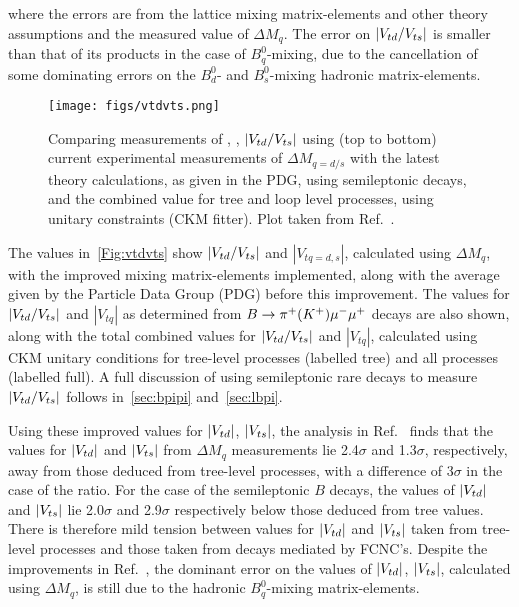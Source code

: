 where the errors are from the lattice mixing matrix-elements and other theory assumptions and the measured value of $\Delta M_{q}$. The error on $|{V_{{t}{d}}}/{V_{{t}{s}}}|$ is smaller than that of its products in the case of $B^{0}_{q}$-mixing, due to the cancellation of some dominating errors on the $B^{0}_{d}$- and $B^{0}_{s}$-mixing hadronic matrix-elements. %
\begin{figure}
\texttt{[image: figs/vtdvts.png]}
\caption{Comparing measurements of \Vtd, \Vts, $|{V_{{t}{d}}}/{V_{{t}{s}}}|$ using (top to bottom) current experimental measurements of $\Delta M_{q = d/s}$ with the latest theory calculations, as given in the PDG\cite{pdg},  using semileptonic decays, and the combined value for tree and loop level processes, using unitary constraints (CKM fitter\cite{ckm}). Plot taken from Ref.~\cite{vtdvts}.}
\label{Fig:vtdvts}
\end{figure}

The values in~\autoref{Fig:vtdvts} show $|{V_{{t}{d}}}/{V_{{t}{s}}}|$ and $|V_{tq = d,s}|$, calculated using $\Delta M_{q}$, with the improved mixing matrix-elements implemented, along with the average given by the Particle Data Group (PDG)\cite{pdg} before this improvement. The values for $|{V_{{t}{d}}}/{V_{{t}{s}}}|$ and $|V_{tq}|$ as determined from ${B}\rightarrow{\ensuremath{{\pi}^+}}({K}^{+}){\mu^-}{\mu^+}$ decays are also shown, along with the total combined values for $|{V_{{t}{d}}}/{V_{{t}{s}}}|$ and $|V_{tq}|$, calculated using CKM unitary conditions for tree-level processes (labelled tree) and all processes (labelled full). A full discussion of using semileptonic rare decays to measure $|{V_{{t}{d}}}/{V_{{t}{s}}}|$ follows in~\autoref{sec:bpipi} and~\autoref{sec:lbpi}.    %

Using these improved values for $|{V_{{t}{d}}}|$, $|{V_{{t}{s}}}|$, the analysis in Ref.~\cite{vtdvts} finds that the values for $|{V_{{t}{d}}}|$ and $|{V_{{t}{s}}}|$ from $\Delta M_{q}$ measurements lie 2.4$\sigma$ and 1.3$\sigma$, respectively, away from those deduced from tree-level processes, with a difference of 3$\sigma$ in the case of the ratio. For the case of the semileptonic $B$ decays, the values of $|{V_{{t}{d}}}|$ and $|{V_{{t}{s}}}|$ lie  2.0$\sigma$ and 2.9$\sigma$ respectively below those deduced from tree values. 
There is therefore mild tension between values for $|{V_{{t}{d}}}|$ and $|{V_{{t}{s}}}|$ taken from tree-level processes and those taken from decays mediated by FCNC's. Despite the improvements in Ref.~\cite{vtdvts}, the dominant error on the values of $|{V_{{t}{d}}}|$, $|{V_{{t}{s}}}|$, calculated using $\Delta M_{q}$, is still due to the hadronic $B^{0}_{q}$-mixing matrix-elements.

